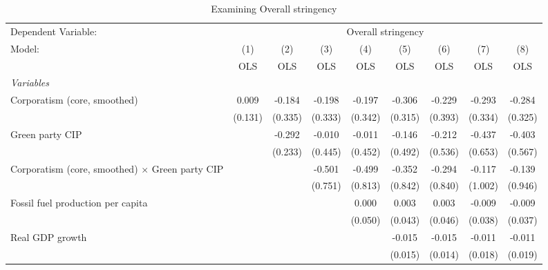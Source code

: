 
\begin{table}[htbp]
   \caption{Examining Overall stringency}
   \centering
   \begin{tabular}{lcccccccc}
      \toprule
      Dependent Variable: & \multicolumn{8}{c}{Overall stringency}\\
      Model:                                                 & (1)     & (2)     & (3)     & (4)     & (5)     & (6)     & (7)     & (8)\\  
                                                             &  OLS    & OLS     & OLS     & OLS     & OLS     & OLS     & OLS     & OLS\\  
      \midrule
      \emph{Variables}\\
      Corporatism (core, smoothed)                           & 0.009   & -0.184  & -0.198  & -0.197  & -0.306  & -0.229  & -0.293  & -0.284\\   
                                                             & (0.131) & (0.335) & (0.333) & (0.342) & (0.315) & (0.393) & (0.334) & (0.325)\\   
      Green party CIP                                        &         & -0.292  & -0.010  & -0.011  & -0.146  & -0.212  & -0.437  & -0.403\\   
                                                             &         & (0.233) & (0.445) & (0.452) & (0.492) & (0.536) & (0.653) & (0.567)\\   
      Corporatism (core, smoothed) $\times$ Green party CIP  &         &         & -0.501  & -0.499  & -0.352  & -0.294  & -0.117  & -0.139\\   
                                                             &         &         & (0.751) & (0.813) & (0.842) & (0.840) & (1.002) & (0.946)\\   
      Fossil fuel production per capita                      &         &         &         & 0.000   & 0.003   & 0.003   & -0.009  & -0.009\\   
                                                             &         &         &         & (0.050) & (0.043) & (0.046) & (0.038) & (0.037)\\   
      Real GDP growth                                        &         &         &         &         & -0.015  & -0.015  & -0.011  & -0.011\\   
                                                             &         &         &         &         & (0.015) & (0.014) & (0.018) & (0.019)\\   

\end{tabular}
\end{table}
